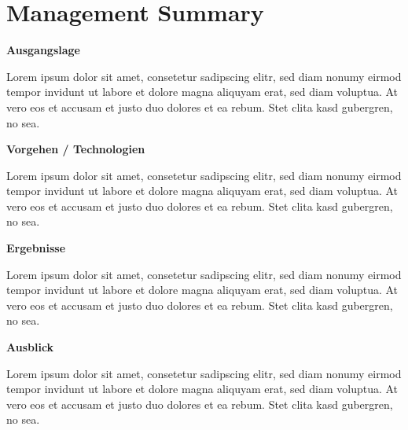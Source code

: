 
\chapter*{Management Summary}

\textbf{Ausgangslage}

Lorem ipsum dolor sit amet, consetetur sadipscing elitr, sed diam nonumy eirmod tempor invidunt ut labore et dolore magna aliquyam erat, sed diam voluptua. At vero eos et accusam et justo duo dolores et ea rebum. Stet clita kasd gubergren, no sea.

\textbf{Vorgehen / Technologien}

Lorem ipsum dolor sit amet, consetetur sadipscing elitr, sed diam nonumy eirmod tempor invidunt ut labore et dolore magna aliquyam erat, sed diam voluptua. At vero eos et accusam et justo duo dolores et ea rebum. Stet clita kasd gubergren, no sea. 

\textbf{Ergebnisse}

Lorem ipsum dolor sit amet, consetetur sadipscing elitr, sed diam nonumy eirmod tempor invidunt ut labore et dolore magna aliquyam erat, sed diam voluptua. At vero eos et accusam et justo duo dolores et ea rebum. Stet clita kasd gubergren, no sea. 

\textbf{Ausblick}

Lorem ipsum dolor sit amet, consetetur sadipscing elitr, sed diam nonumy eirmod tempor invidunt ut labore et dolore magna aliquyam erat, sed diam voluptua. At vero eos et accusam et justo duo dolores et ea rebum. Stet clita kasd gubergren, no sea.
